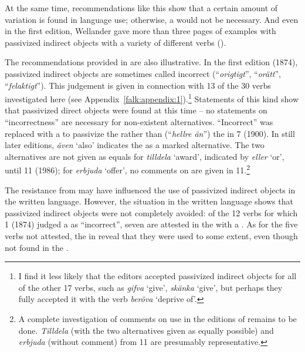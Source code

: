 \documentclass[output=paper]{langscibook}
\begin{document}
At the same time, recommendations like this show that a certain amount of variation is found in language use; otherwise, a  would not be necessary. And even in the first edition, Wellander gave more than three pages of examples with passivized indirect objects with a variety of different verbs (\citeyear[297–301]{Wellander1939}).  



The recommendations provided in  are also illustrative. In the first edition (1874), passivized indirect objects are sometimes called incorrect (“\textit{origtigt}”, “\textit{orätt}”, “\textit{felaktigt}”). This judgement is given in connection with 13 of the 30 verbs investigated here (see Appendix~\ref{falk:appendix:1}).\footnote{I find it less likely that the editors accepted passivized indirect objects for all of the other 17 verbs, such as \textit{gifva} ‘give’, \textit{skänka} ‘give’, but perhaps they fully accepted it with the verb \textit{beröva} ‘deprive of’.} Statements of this kind show that passivized direct objects were found at this time – no statements on “incorrectness” are necessary for non-existent alternatives. “Incorrect” was replaced with a  to passivize the  rather than (“\textit{hellre än}”) the  in  7 (1900). In still later editions, \textit{även} ‘also’ indicates the  as a marked alternative. The two alternatives are not given as equals for \textit{tilldela} ‘award’, indicated by \textit{eller} ‘or’, until  11 (1986); for \textit{erbjuda} ‘offer’, no comments on  are given in  11.\footnote{A complete investigation of comments on use in the editions of  remains to be done. \textit{Tilldela} (with the two alternatives given as equally possible) and \textit{erbjuda} (without comment) from  11 are presumably representative.}



The resistance from  may have influenced the use of passivized indirect objects in the written language. However, the situation in the written language shows that passivized indirect objects were not completely avoided: of the 12 verbs for which  1 (1874) judged a  as “incorrect”, seven are attested in the  with a . As for the five verbs not attested, the  in  reveal that they were used to some extent, even though not found in the .
\end{document}
